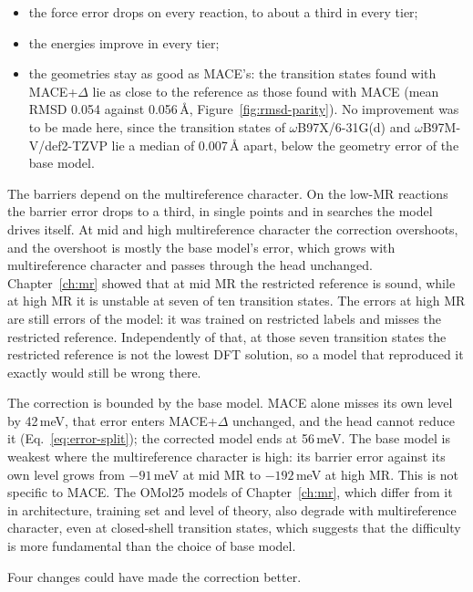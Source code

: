 \begin{itemize}
  \item the force error drops on every reaction, to about a third in
    every tier;
  \item the energies improve in every tier;
  \item the geometries stay as good as MACE's: the transition states
    found with MACE+$\Delta$ lie as close to the reference as those
    found with MACE (mean RMSD 0.054 against 0.056\,\AA,
    Figure~\ref{fig:rmsd-parity}). No improvement was to be made
    here, since the transition states of
    \mbox{$\omega$B97X/6-31G(d)} and \mbox{$\omega$B97M-V/def2-TZVP}
    lie a median of 0.007\,\AA{} apart, below the geometry error
    of the base model.
\end{itemize}

The barriers depend on the multireference character. On the low-MR
reactions the barrier error drops to a third, in single points and in
searches the model drives itself. At mid and high multireference
character the correction overshoots, and the overshoot is mostly the
base model's error, which grows with multireference character and
passes through the head unchanged. Chapter~\ref{ch:mr} showed that
at mid MR the restricted reference is sound, while at high MR it is
unstable at seven of ten transition states. The errors at high MR are
still errors of the model: it was trained on restricted labels and
misses the restricted reference. Independently of that, at those seven
transition states the restricted reference is not the lowest DFT
solution, so a model that reproduced it exactly would still be wrong
there.

The correction is bounded by the base model. MACE alone misses its
own level by 42\,meV, that error enters MACE+$\Delta$ unchanged, and
the head cannot reduce it (Eq.~\eqref{eq:error-split}); the corrected
model ends at 56\,meV. The base model is weakest where the
multireference character is high: its barrier error against its own
level grows from $-91$\,meV at mid MR to $-192$\,meV at high MR. This
is not specific to MACE. The OMol25 models of Chapter~\ref{ch:mr},
which differ from it in architecture, training set and level of
theory, also degrade with multireference character, even at
closed-shell transition states, which suggests that the difficulty is
more fundamental than the choice of base model.

Four changes could have made the correction better.

